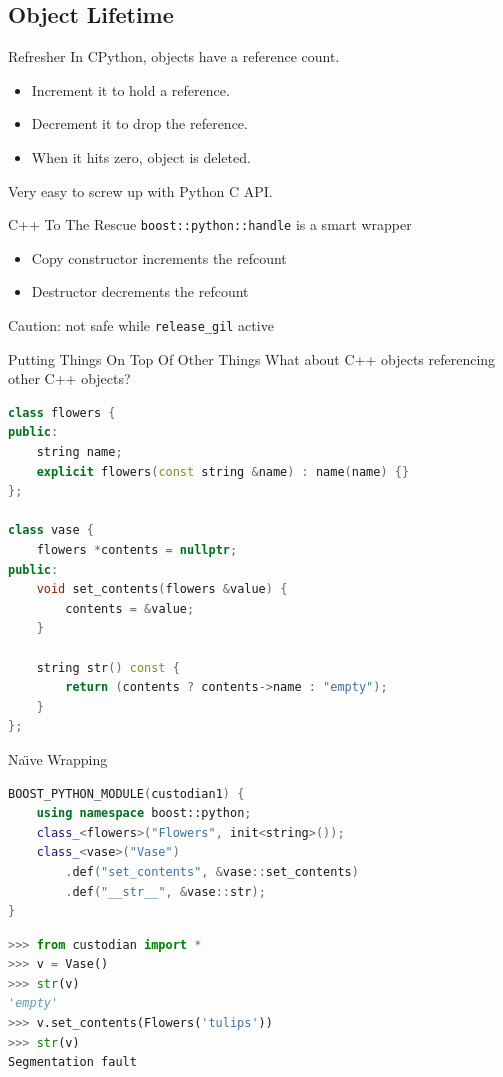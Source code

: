 \documentclass{beamer}
\def\linlinec{\lstinline[basicstyle=\ttfamily,language=c++]}
\begin{document}
\subsection{Object Lifetime}

\begin{frame}{Refresher}
  In CPython, objects have a \alert{reference count}.
  \begin{itemize}
    \item Increment it to hold a reference.
    \item Decrement it to drop the reference.
    \item When it hits zero, object is deleted.
  \end{itemize}
  Very easy to screw up with Python C API.
\end{frame}

\begin{frame}{C++ To The Rescue}
  \linlinec"boost::python::handle" is a smart wrapper
  \begin{itemize}
    \item Copy constructor increments the refcount
    \item Destructor decrements the refcount
  \end{itemize}

  \pause
  \alert{Caution}: not safe while \linlinec{release_gil} active
\end{frame}

\begin{frame}[fragile=singleslide]{Putting Things On Top Of Other Things}
  What about C++ objects referencing other C++ objects?
  \begin{lstlisting}[language=c++]
class flowers {
public:
    string name;
    explicit flowers(const string &name) : name(name) {}
};

class vase {
    flowers *contents = nullptr;
public:
    void set_contents(flowers &value) {
        contents = &value;
    }

    string str() const {
        return (contents ? contents->name : "empty");
    }
};
  \end{lstlisting}
\end{frame}

\begin{frame}[fragile]{Na{\"\i}ve Wrapping}
  \begin{lstlisting}[language=c++]
BOOST_PYTHON_MODULE(custodian1) {
    using namespace boost::python;
    class_<flowers>("Flowers", init<string>());
    class_<vase>("Vase")
        .def("set_contents", &vase::set_contents)
        .def("__str__", &vase::str);
}
  \end{lstlisting}
  \pause
  \begin{lstlisting}[language=python,numbers=none]
>>> from custodian import *
>>> v = Vase()
>>> str(v)
'empty'
>>> v.set_contents(Flowers('tulips'))
>>> str(v)
Segmentation fault
  \end{lstlisting}
\end{frame}
\end{document}
